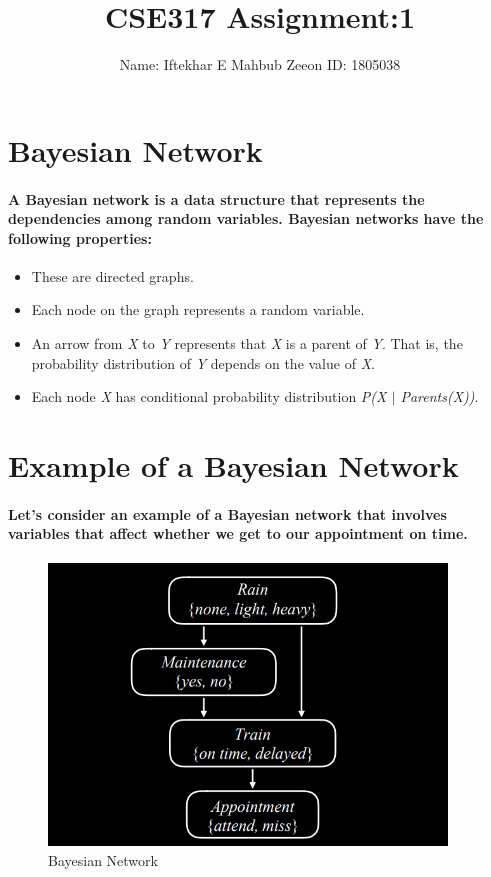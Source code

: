 \documentclass[16pt, A4Paper]{article}
\title{CSE317 Assignment:1}
\author{Name: Iftekhar E Mahbub Zeeon \hspace{5 cm} ID: 1805038 }
\begin{document}
\maketitle

\noindent\makebox[\linewidth]{\rule{\paperwidth}{0.4pt}}

\section*{Bayesian Network}
\paragraph{A Bayesian network is a data structure that represents the dependencies among random variables. Bayesian networks have the following properties:}

\begin{itemize}
  \item These are directed graphs.
  \item Each node on the graph represents a random variable.
  \item An arrow from \textit{X} to \textit{Y} represents that \textit{X} is a parent of \textit{Y}. That is, the probability distribution of \textit{Y} depends on the value of \textit{X}.
  \item Each node \textit{X} has conditional probability distribution \textit{P(X $|$ Parents(X))}.
\end{itemize}

\section*{Example of a Bayesian Network}
\paragraph{Let’s consider an example of a Bayesian network that involves variables that affect whether we get to our appointment on time.}

\begin{figure}[htpb]
\centering
\includegraphics[width=300pt]{bayesian_network.png}
\caption{Bayesian Network}
\end{figure}
\end{document}
